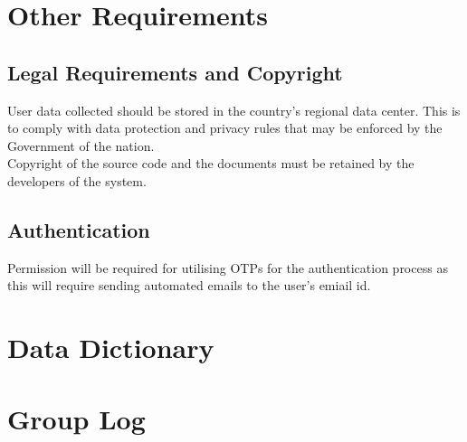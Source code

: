 \documentclass[11pt]{article}
\begin{document}
\newpage
\section{Other Requirements}
\subsection{Legal Requirements and Copyright}
User data collected should be stored in the country’s regional data center. This is to comply with data protection and privacy rules that may be enforced by the Government of the nation. 
\\
Copyright of the source code and the documents must be retained by the developers of the system.

\subsection{Authentication}
Permission will be required for utilising OTPs for the authentication process as this will require sending automated emails to the user's emiail id. 

\appendixpageoff
\begin{appendices}
\newpage
\section{Data Dictionary}

\newpage
\section{Group Log}
\end{appendices}
\end{document}
